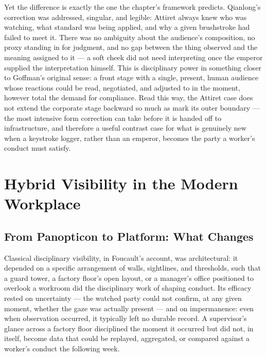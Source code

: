 \documentclass[10pt]{article}
\begin{document}
Yet the difference is exactly the one the chapter's framework predicts. Qianlong's correction was addressed, singular, and legible: Attiret always knew who was watching, what standard was being applied, and why a given brushstroke had failed to meet it. There was no ambiguity about the audience's composition, no proxy standing in for judgment, and no gap between the thing observed and the meaning assigned to it --- a soft cheek did not need interpreting once the emperor supplied the interpretation himself. This is disciplinary power in something closer to Goffman's original sense: a front stage with a single, present, human audience whose reactions could be read, negotiated, and adjusted to in the moment, however total the demand for compliance. Read this way, the Attiret case does not extend the corporate stage backward so much as mark its outer boundary --- the most intensive form correction can take before it is handed off to infrastructure, and therefore a useful contrast case for what is genuinely new when a keystroke logger, rather than an emperor, becomes the party a worker's conduct must satisfy.

\section{Hybrid Visibility in the Modern Workplace}

\subsection{From Panopticon to Platform: What Changes}

Classical disciplinary visibility, in Foucault's account, was architectural: it depended on a specific arrangement of walls, sightlines, and thresholds, such that a guard tower, a factory floor's open layout, or a manager's office positioned to overlook a workroom did the disciplinary work of shaping conduct. Its efficacy rested on uncertainty --- the watched party could not confirm, at any given moment, whether the gaze was actually present --- and on impermanence: even when observation occurred, it typically left no durable record. A supervisor's glance across a factory floor disciplined the moment it occurred but did not, in itself, become data that could be replayed, aggregated, or compared against a worker's conduct the following week.
\end{document}
